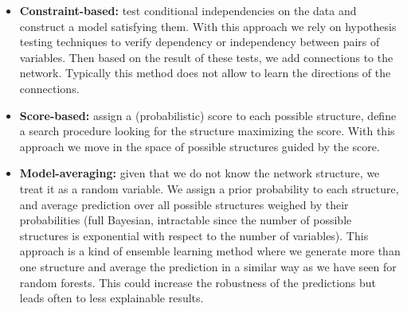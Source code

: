 \begin{itemize}
    \item \textbf{Constraint-based:} test conditional independencies on the data and construct a model satisfying them. With this approach we rely on hypothesis testing techniques to verify dependency or independency between pairs of variables. Then based on the result of these tests, we add connections to the network. Typically this method does not allow to learn the directions of the connections.
    
    \item \textbf{Score-based:} assign a (probabilistic) score to each possible structure, define a search procedure looking for the structure maximizing the score. With this approach we move in the space of possible structures guided by the score.
    
    \item \textbf{Model-averaging:} given that we do not know the network structure, we treat it as a random variable. We assign a prior probability to each structure, and average prediction over all possible structures weighed by their probabilities (full Bayesian, intractable since the number of possible structures is exponential with respect to the number of variables). This approach is a kind of ensemble learning method where we generate more than one structure and average the prediction in a similar way as we have seen for random forests. This could increase the robustness of the predictions but leads often to less explainable results.
\end{itemize}